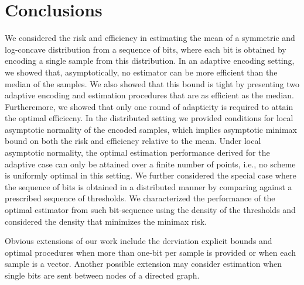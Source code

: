 \section{Conclusions \label{sec:conclusions}}
We considered the risk and efficiency in estimating the mean of a symmetric and log-concave distribution from a sequence of bits, where each bit is obtained by encoding a single sample from this distribution. 
%
In an adaptive encoding setting, we showed that, asymptotically, no estimator can be more efficient than the median of the samples. We also showed that this bound is tight by presenting two adaptive encoding and estimation procedures that are as efficient as the median. Furtheremore, we showed that only one round of adapticity is required to attain the optimal efficiecny. In the distributed setting we provided conditions for local asymptotic normality of the encoded samples, which implies asymptotic minimax bound on both the risk and efficiency relative to the mean. 
%
Under local asymptotic normality, the optimal estimation performance derived for the adaptive case can only be attained over a finite number of points, i.e., no scheme is uniformly optimal in this setting. 
%
We further considered the special case where the sequence of bits is obtained in a distributed manner by comparing against a prescribed sequence of thresholds. We characterized the performance of the optimal estimator from such bit-sequence using the density of the thresholds and considered the density that minimizes the minimax risk. \par
Obvious extensions of our work include the derviation explicit bounds and optimal procedures when more than one-bit per sample is provided or when each sample is a vector. Another possible extension may consider estimation when single bits are sent between nodes of a directed graph.
